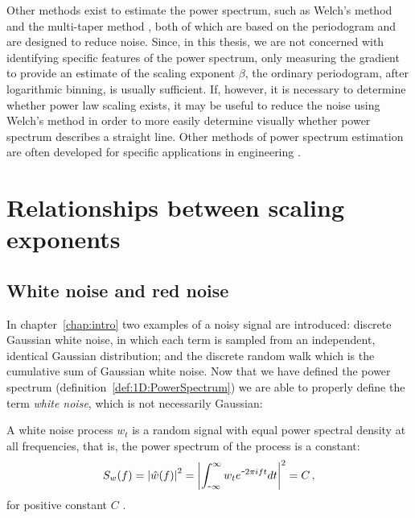 {{{Other methods exist to estimate the power spectrum, such as Welch's method \citep{welch1967} and the multi-taper method \citep{thomson1982}, both of which are based on the periodogram and are designed to reduce noise. Since, in this thesis, we are not concerned with identifying specific features of the power spectrum, only measuring the gradient to provide an estimate of the scaling exponent $\beta$, the ordinary periodogram, after logarithmic binning, is usually sufficient. If, however, it is necessary to determine whether power law scaling exists, it may be useful to reduce the noise using Welch's method in order to more easily determine visually whether power spectrum describes a straight line. Other methods of power spectrum estimation are often developed for specific applications in engineering \citep{bingham1967}.

}}



\section{Relationships between scaling exponents}
\label{sec:1D:relationships}

\subsection{White noise and red noise}
\label{subsec:1D:relationships:white_and_red_noise}
{\Red
	
In chapter~\ref{chap:intro} two examples of a noisy signal are introduced: discrete Gaussian white noise, in which each term is sampled from an independent, identical Gaussian distribution; and the discrete random walk which is the cumulative sum of Gaussian white noise. Now that we have defined the power spectrum (definition~\ref{def:1D:PowerSpectrum}) we are able to properly define the term \emph{white noise}, which is not necessarily Gaussian:

\begin{definition}
	\label{def:1D:whitenoise}
	A white noise process $w_t$ is a random signal with equal power spectral density at all frequencies, that is, the power spectrum of the process is a constant:
	\begin{equation}
		\label{eqn:1D:white_noise_def}
		S_w(f)=\left|\hat{w}(f)\right|^2 = \left|\int_{\textup{\texttt{-}} \infty}^{\infty} w_t e^{\textup{\texttt{-}} 2\pi i f t} dt\right|^2 = C\,,
	\end{equation}
	for positive constant $C$ \citep{robinson2012introduction}.
\end{definition}

}}
